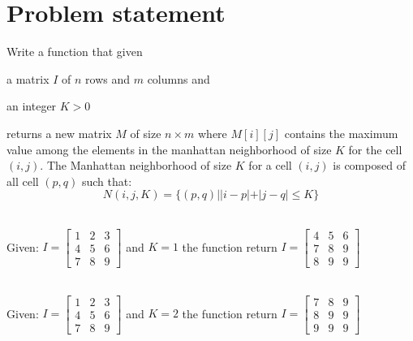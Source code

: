 \section{Problem statement}
\begin{exercise}
\label{example:max_manhattan:exercice1}
Write a function that given \begin{enumerate*}
	\item a matrix $I$ of $n$ rows and $m$ columns and
	\item  an integer $K > 0$
\end{enumerate*}
returns a new matrix $M$ of size $n \times m$ where $M[i][j]$ contains the maximum value among the
elements in the manhattan neighborhood of size $K$ for the cell $(i,j)$. The Manhattan neighborhood
of size $K$ for a cell $(i,j)$ is composed of all cell $(p,q)$ such that:
\begin{equation}
	N(i,j, K) = \{(p,q) | |i-p|+|j-q| \leq K\}
	\label{eq:max_manhattan:neighbood_equation}
\end{equation}


\end{exercise}
	\begin{example}
		\label{example:max_manhattan:example1}
		\hfill \\
		Given: $I=
		\begin{bmatrix}
		  1 & 2 & 3  \\
		  4 & 5 & 6  \\
		  7 & 8 & 9  
		\end{bmatrix}
	  $
  and $K=1$ the function return $I=
  \begin{bmatrix}
	  4 & 5 & 6  \\
	  7 & 8 & 9  \\
	  8 & 9 & 9  
	\end{bmatrix}
$
		
	\end{example}

	\begin{example}
		\label{example:max_manhattan:example2}
		\hfill \\
		Given: $I=
		\begin{bmatrix}
		  1 & 2 & 3  \\
		  4 & 5 & 6  \\
		  7 & 8 & 9  
		\end{bmatrix}
	  $
  and $K=2$ the function return $I=
  \begin{bmatrix}
	  7 & 8 & 9  \\
	  8 & 9 & 9  \\
	  9 & 9 & 9  
	\end{bmatrix}
$
		
	\end{example}




